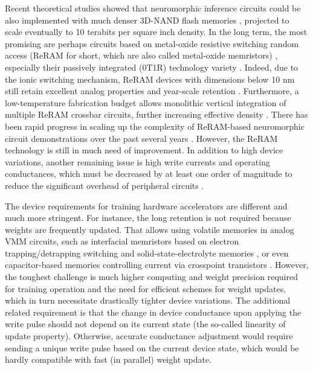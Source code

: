 Recent theoretical studies showed that neuromorphic inference circuits could be also implemented with much denser 3D-NAND flash memories \cite{Bavandpour2019NAND, Bavandpour2020, Lee2019NAND}, projected to scale eventually to 10 terabits per square inch density. In the long term, the most promising are perhaps circuits based on metal-oxide resistive switching random access (ReRAM for short, which are also called metal-oxide memristors) \cite{Yang2013NatureNano, Yu2018IEEE}, especially their passively integrated (0T1R) technology variety \cite{Kim2019XBAR}. Indeed, due to the ionic switching mechanism, ReRAM devices with dimensions below 10 nm still retain excellent analog properties and year-scale retention \cite{Govoreanu2013}. Furthermore, a low-temperature fabrication budget allows monolithic vertical integration of multiple ReRAM crossbar circuits, further increasing effective density \cite{Adam2017}. There has been rapid progress in scaling up the complexity of ReRAM-based neuromorphic circuit demonstrations over the past several years \cite{Prezioso2015, MerrikhBayat2018, Lin2020NatElec, Hu2018AdvMat, Yao2020Nature, Liu2020ISSCC, Kim2019XBAR}. However, the ReRAM technology is still in much need of improvement. In addition to high device variations, another remaining issue is high write currents and operating conductances, which must be decreased by at least one order of magnitude to reduce the significant overhead of peripheral circuits \cite{Kim2019XBAR}.

The device requirements for training hardware accelerators are different and much more stringent. For instance, the long retention is not required because weights are frequently updated. That allows using volatile memories in analog VMM circuits, such as interfacial memristors based on electron trapping/detrapping switching \cite{Sheridan2017, Cai2019NatElec, Chu2014Neuro} and solid-state-electrolyte memories \cite{Fuller2019, Yeon2020, Berggren2020}, or even capacitor-based memories controlling current via crosspoint transistors \cite{Ambrogio2018}. However, the toughest challenge is much higher computing and weight precision required for training operation and the need for efficient schemes for weight updates, which in turn necessitate drastically tighter device variations. The additional related requirement is that the change in device conductance upon applying the write pulse should not depend on its current state (the so-called linearity of update property). Otherwise, accurate conductance adjustment would require sending a unique write pulse based on the current device state, which would be hardly compatible with fast (in parallel) weight update. 

